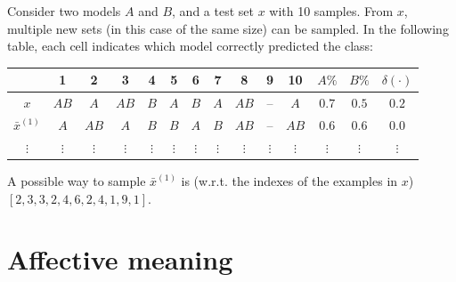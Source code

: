 \begin{description}
        \begin{example}
            Consider two models $A$ and $B$, and a test set $x$ with 10 samples. From $x$, multiple new sets (in this case of the same size) can be sampled. In the following table, each cell indicates which model correctly predicted the class:
            \begin{center}
                \footnotesize
                \begin{tabular}{ccccccccccc|ccc}
                    \toprule
                                    & 1 & 2 & 3 & 4 & 5 & 6 & 7 & 8 & 9 & 10 & $A\%$ & $B\%$ & $\delta(\cdot)$ \\
                    \midrule
                    $x$             & $AB$ & $A$ & $AB$ & $B$ & $A$ & $B$ & $A$ & $AB$ & -- & $A$ & $0.7$ & $0.5$ & $0.2$ \\
                    $\bar{x}^{(1)}$   & $A$ & $AB$ & $A$ & $B$ & $B$ & $A$ & $B$ & $AB$ & -- & $AB$ & $0.6$ & $0.6$ & $0.0$ \\
                    $\vdots$ & $\vdots$ & $\vdots$ & $\vdots$ & $\vdots$ & $\vdots$ & $\vdots$ & $\vdots$ & $\vdots$ & $\vdots$ & $\vdots$ & $\vdots$ & $\vdots$ & $\vdots$ \\
                    \bottomrule
                \end{tabular}
            \end{center}
            A possible way to sample $\bar{x}^{(1)}$ is (w.r.t. the indexes of the examples in $x$) $[2, 3, 3, 2, 4, 6, 2, 4, 1, 9, 1]$.
        \end{example}
\end{description}



\section{Affective meaning}


